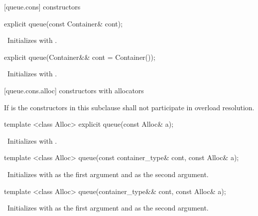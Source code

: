 [queue.cons]{ constructors}

\begin{itemdecl}
explicit queue(const Container& cont);
\end{itemdecl}

\begin{itemdescr}
\pnum
\effects\ Initializes  with .
\end{itemdescr}

\begin{itemdecl}
explicit queue(Container&& cont = Container());
\end{itemdecl}

\begin{itemdescr}
\pnum
\effects\ Initializes  with .
\end{itemdescr}

[queue.cons.alloc]{ constructors with allocators}

\pnum
If  is 
the constructors in this subclause shall not participate in overload resolution.

\begin{itemdecl}
template <class Alloc> explicit queue(const Alloc& a);
\end{itemdecl}

\begin{itemdescr}
\pnum
\effects\ Initializes  with .
\end{itemdescr}

\begin{itemdecl}
template <class Alloc> queue(const container_type& cont, const Alloc& a);
\end{itemdecl}

\begin{itemdescr}
\pnum
\effects\ Initializes  with  as the first argument and 
as the second argument.
\end{itemdescr}

\begin{itemdecl}
template <class Alloc> queue(container_type&& cont, const Alloc& a);
\end{itemdecl}

\begin{itemdescr}
\pnum
\effects\ Initializes  with  as the first argument and 
as the second argument.
\end{itemdescr}

